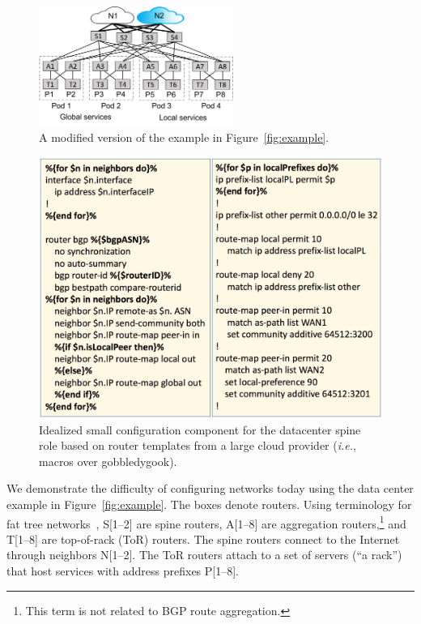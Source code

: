 \documentclass[numbers, 10pt, preprint]{sigplanconf}
\newcommand{\IE}{\emph{i.e.}}
\begin{document}
\begin{figure}[t!]
  \centering
  \includegraphics[width=2.5in]{figures/example2}
  \caption{A modified version of the example in Figure~\ref{fig:example}.}
  \label{fig:example2}
  \vspace{-1em}
\end{figure}

\begin{figure}[t!]
  \centering
  \includegraphics[width=\columnwidth]{figures/templates}
  \caption{Idealized small configuration component for the datacenter spine role based on router templates from a large cloud provider (\IE, macros over gobbledygook).}
  \label{fig:templates}
  \vspace{-.8em}
\end{figure}

We demonstrate the difficulty of configuring networks today using the data center example in Figure~\ref{fig:example}. The boxes denote routers. Using terminology for fat tree networks~\cite{fattree}, S[1--2] are spine routers, A[1--8] are aggregation routers,\footnote{This term is not related to BGP route aggregation.} and T[1--8] are top-of-rack (ToR) routers. The spine routers connect to the Internet through neighbors N[1--2].
The ToR routers attach to a set of servers (``a rack'') that host services with address prefixes P[1--8].
\end{document}
